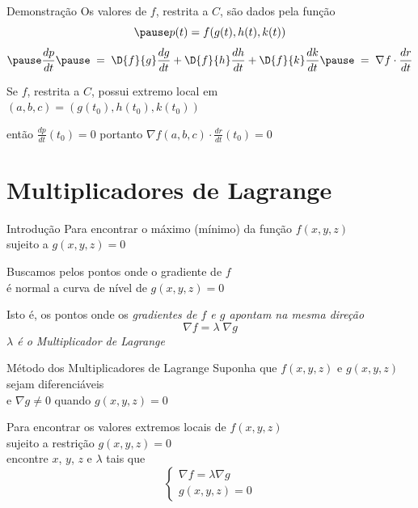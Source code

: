 \begin{proofframe}{Demonstração}
  Os valores de $f$, restrita a $C$, são dados pela função
  \[
    \pause
    p(t) = f(g(t), h(t), k(t))
  \]
  \[
    \pause
    \frac{dp}{dt}
    \pause
    \;=\; \D{f}{g}\frac{dg}{dt}
    + \D{f}{h}\frac{dh}{dt}
    + \D{f}{k}\frac{dk}{dt}
    \pause
    \;=\; \nabla f \cdot \frac{dr}{dt}
  \]

  \pause
  Se $f$, restrita a $C$, possui extremo local em \((a, b, c) = (g(t_0), h(t_0), k(t_0))\)

  \pause
  \vspace{0.4\baselineskip}
  então \(\frac{dp}{dt}(t_0)=0\)
  \pause
  \qquad
  portanto
  \quad
  \emph{\(
    \nabla f(a, b, c) \cdot \frac{dr}{dt}(t_0) = 0
  \)}
\end{proofframe}

\section{Multiplicadores de Lagrange}

\begin{frame}{Introdução}
  Para encontrar o máximo (mínimo) da função \(f(x, y, z)\)\\[2mm]
  sujeito a \(g(x, y, z) = 0\)

  \pause
  \vspace{\baselineskip}
  Buscamos pelos pontos onde o gradiente de $f$ \\
  é normal a curva de nível de \(g(x, y, z) = 0\)

  \pause
  \vspace{\baselineskip}
  Isto é, os pontos onde os \emph{gradientes de $f$ e $g$ apontam na mesma direção}
  \pause
  \[
    \nabla f = \lambda\;\nabla g
  \]
  \pause
  \emph{\(\lambda\) é o Multiplicador de Lagrange}
\end{frame}


\begin{frame}{Método dos Multiplicadores de Lagrange}
  Suponha que \(f(x, y, z)\) e \(g(x, y, z)\) sejam diferenciáveis\\[2mm]
  e \(\nabla g\neq 0\) quando \(g(x, y, z)=0\)

  \pause
  \vspace{\baselineskip}
  Para encontrar os valores extremos locais de \(f(x, y, z)\) \\[2mm]
  \pause
  sujeito a restrição \(g(x, y, z)=0\) \\[2mm]
  \pause
  encontre $x$, $y$, $z$ e $\lambda$ tais que
  \[
    \begin{cases}
      \nabla f = \lambda \nabla g   \\
      g(x, y, z) = 0
    \end{cases}
  \]
\end{frame}

